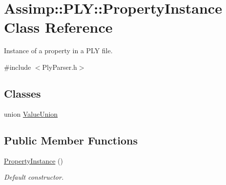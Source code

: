 \hypertarget{class_assimp_1_1_p_l_y_1_1_property_instance}{\section{Assimp\+:\+:P\+L\+Y\+:\+:Property\+Instance Class Reference}
\label{class_assimp_1_1_p_l_y_1_1_property_instance}
}


Instance of a property in a P\+L\+Y file.  




{\ttfamily \#include $<$Ply\+Parser.\+h$>$}

\subsection*{Classes}
\begin{DoxyCompactItemize}
\item 
union \hyperlink{union_assimp_1_1_p_l_y_1_1_property_instance_1_1_value_union}{Value\+Union}
\end{DoxyCompactItemize}
\subsection*{Public Member Functions}
\begin{DoxyCompactItemize}
\item 
\hypertarget{class_assimp_1_1_p_l_y_1_1_property_instance_a3a5b9c3e06efab5402c3f5501db221dc}{\hyperlink{class_assimp_1_1_p_l_y_1_1_property_instance_a3a5b9c3e06efab5402c3f5501db221dc}{Property\+Instance} ()}\label{class_assimp_1_1_p_l_y_1_1_property_instance_a3a5b9c3e06efab5402c3f5501db221dc}

\begin{DoxyCompactList}\small\item\em Default constructor. \end{DoxyCompactList}\end{DoxyCompactItemize}

